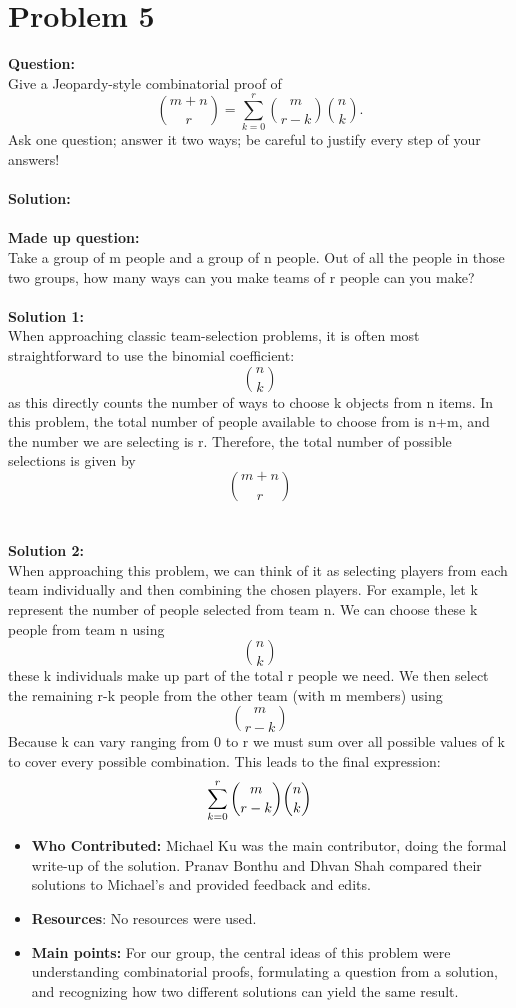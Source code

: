 \documentclass{article}
\begin{document}
\section*{Problem 5}
\textbf{Question:}\\ Give a Jeopardy-style combinatorial proof of 
\[
\binom{m+n}{r} = \sum_{k=0}^{r} \binom{m}{r-k}\binom{n}{k}.
\]
Ask one question; answer it two ways; be careful to justify every step of your answers! \\\\
\textbf{Solution:}\\\\
\textbf{Made up question:}\\ Take a group of m people and a group of n people. Out of all the people in those two groups, how many ways can you make teams of r people can you make? \\\\
\textbf{Solution 1:}\\ When approaching classic team-selection problems, it is often most straightforward to use the binomial coefficient: \[\binom{n}{k}\] as this directly counts the number of ways to choose  k objects from n items. In this problem, the total number of people available to choose from is 
n+m, and the number we are selecting is r. Therefore, the total number of possible selections is given by \[\binom{m+n}{r}\] \\\\
\textbf{Solution 2:}\\
When approaching this problem, we can think of it as selecting players from each team individually and then combining the chosen players. For example, let k represent the number of people selected from team n. We can choose these 
k people from team n using \[\binom{n}{k}\] these k individuals make up part of the total r people we need. We then select the remaining r-k people from the other team (with m members) using \[\binom{m}{r-k}\] Because k can vary ranging from 0 to r we must sum over all possible values of k to cover every possible combination. This leads to the final expression:
\[\sum_{k=0}^{r}\binom{m}{r-k}\*\binom{n}{k}\]

\begin{itemize}
\item \textbf{Who Contributed:} Michael Ku was the main contributor, doing the formal write-up of the solution. Pranav Bonthu and Dhvan Shah compared their solutions to Michael's and provided feedback and edits.
\item \textbf{Resources}: No resources were used.
\item \textbf{Main points:}  For our group, the central ideas of this problem were understanding combinatorial proofs, formulating a question from a solution, and recognizing how two different solutions can yield the same result.
\end{itemize}
\end{document}

